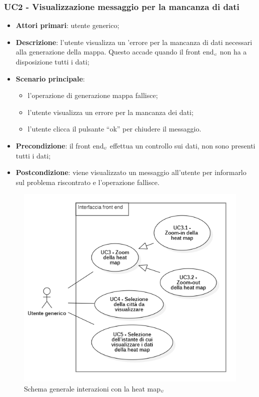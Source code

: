 \subsubsection{UC2 - Visualizzazione messaggio per la mancanza di dati }\label{CasiDUsoCasiDUsoTraUnUtenteEIlFrontEndElencoCasiDUsoUC2VisualizzazioneMessaggioPerLaMancanzaDiDati} %
\begin{itemize}
	\item \textbf{Attori primari}: utente generico;
	\item \textbf{Descrizione}: l’utente visualizza un  ’errore per la mancanza di dati necessari alla generazione della mappa. Questo accade quando il front end$_{\scaleto{G}{3pt}}$ non ha a disposizione tutti i dati;
	\item \textbf{Scenario principale}:
	\begin{itemize}
		\item l’operazione di generazione mappa fallisce;
		\item l’utente visualizza un errore per la mancanza dei dati;
		\item l’utente clicca il pulsante “ok” per chiudere il messaggio.
	\end{itemize}
	\item \textbf{Precondizione}: il front end$_{\scaleto{G}{3pt}}$ effettua un controllo sui dati, non sono presenti tutti i dati;
	\item \textbf{Postcondizione}: viene visualizzato un messaggio all’utente per informarlo sul problema riscontrato e l’operazione fallisce.
\end{itemize}


\begin{center}
	\begin{figure}[H]
		\centering\includegraphics[scale=0.8]{../immagini/attori_casi/UC3-4-5.png}
		\caption{Schema generale interazioni con la heat map$_{\scaleto{G}{3pt}}$}
	\end{figure}
\end{center}


